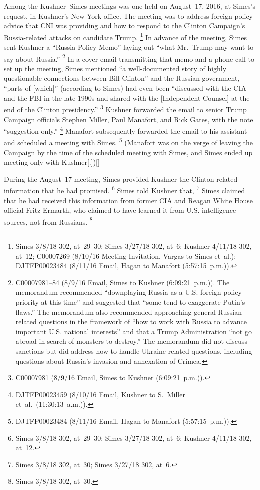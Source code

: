 Among the Kushner--Simes meetings was one held on August~17, 2016, at Simes's request, in Kushner's New York office.
The meeting was to address foreign policy advice that CNI was providing and how to respond to the Clinton Campaign's Russia-related attacks on candidate Trump.%
\footnote{Simes 3/8/18 302, at~29--30;
Simes 3/27/18 302, at~6;
Kushner 4/11/18 302, at~12;
C00007269 (8/10/16 Meeting Invitation, Vargas to Simes et~al.);
DJTFP00023484 (8/11/16 Email, Hagan to Manafort (5:57:15~p.m.)).}
In advance of the meeting, Simes sent Kushner a ``Russia Policy Memo'' laying out ``what Mr.~Trump may want to say about Russia.''%
\footnote{C00007981--84 (8/9/16 Email, Simes to Kushner (6:09:21~p.m.)).
The memorandum recommended ``downplaying Russia as a U.S. foreign policy priority at this time'' and suggested that ``some tend to exaggerate Putin's flaws.''
The memorandum also recommended approaching general Russian related questions in the framework of ``how to work with Russia to advance important U.S. national interests'' and that a Trump Administration ``not go abroad in search of monsters to destroy.''
The memorandum did not discuss sanctions but did address how to handle Ukraine-related questions, including questions about Russia's invasion and annexation of Crimea.}
In a cover email transmitting that memo and a phone call to set up the meeting, Simes mentioned ``a well-documented story of highly questionable connections between Bill Clinton'' and the Russian government, ``parts of [which]'' (according to Simes) had even been ``discussed with the CIA and the FBI in the late 1990s and shared with the [Independent Counsel] at the end of the Clinton presidency.''%
\footnote{C00007981 (8/9/16 Email, Simes to Kushner (6:09:21~p.m.)).}
Kushner forwarded the email to senior Trump Campaign officials Stephen Miller, Paul Manafort, and Rick Gates, with the note ``suggestion only.''%
\footnote{DJTFP00023459 (8/10/16 Email, Kushner to S.~Miller et~al.\ (11:30:13~a.m.)).}
Manafort subsequently forwarded the email to his assistant and scheduled a meeting with Simes.%
\footnote{DJTFP00023484 (8/11/16 Email, Hagan to Manafort (5:57:15~p.m.)).}
(Manafort was on the verge of leaving the Campaign by the time of the scheduled meeting with Simes, and Simes ended up meeting only with Kushner[.])[]

During the August~17 meeting, Simes provided Kushner the Clinton-related information that he had promised.%
\footnote{Simes 3/8/18 302, at~29--30;
Simes 3/27/18 302, at~6;
Kushner 4/11/18 302, at~12.}
Simes told Kushner that,
\footnote{Simes 3/8/18 302, at~30;
Simes 3/27/18 302, at~6.}
Simes claimed that he had received this information from former CIA and Reagan White House official Fritz Ermarth, who claimed to have learned it from U.S. intelligence sources, not from Russians.%
\footnote{Simes 3/8/18 302, at~30.}

